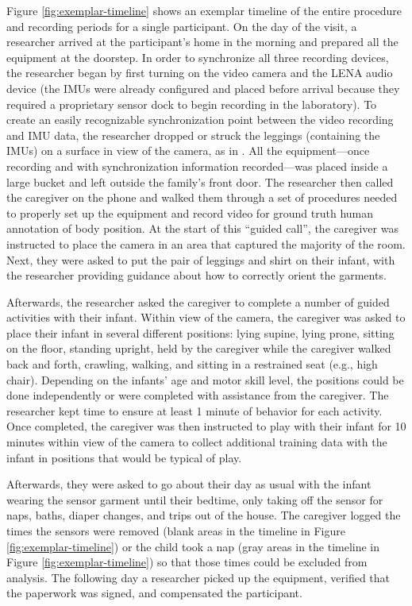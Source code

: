 \documentclass[
  man]{apa6}
\begin{document}
Figure \ref{fig:exemplar-timeline} shows an exemplar timeline of the entire procedure and recording periods for a single participant. On the day of the visit, a researcher arrived at the participant's home in the morning and prepared all the equipment at the doorstep. In order to synchronize all three recording devices, the researcher began by first turning on the video camera and the LENA audio device (the IMUs were already configured and placed before arrival because they required a proprietary sensor dock to begin recording in the laboratory). To create an easily recognizable synchronization point between the video recording and IMU data, the researcher dropped or struck the leggings (containing the IMUs) on a surface in view of the camera, as in \textcite{FranchakScott2021}. All the equipment---once recording and with synchronization information recorded---was placed inside a large bucket and left outside the family's front door. The researcher then called the caregiver on the phone and walked them through a set of procedures needed to properly set up the equipment and record video for ground truth human annotation of body position. At the start of this ``guided call'', the caregiver was instructed to place the camera in an area that captured the majority of the room. Next, they were asked to put the pair of leggings and shirt on their infant, with the researcher providing guidance about how to correctly orient the garments.

Afterwards, the researcher asked the caregiver to complete a number of guided activities with their infant. Within view of the camera, the caregiver was asked to place their infant in several different positions: lying supine, lying prone, sitting on the floor, standing upright, held by the caregiver while the caregiver walked back and forth, crawling, walking, and sitting in a restrained seat (e.g., high chair). Depending on the infants' age and motor skill level, the positions could be done independently or were completed with assistance from the caregiver. The researcher kept time to ensure at least 1 minute of behavior for each activity. Once completed, the caregiver was then instructed to play with their infant for 10 minutes within view of the camera to collect additional training data with the infant in positions that would be typical of play.

Afterwards, they were asked to go about their day as usual with the infant wearing the sensor garment until their bedtime, only taking off the sensor for naps, baths, diaper changes, and trips out of the house. The caregiver logged the times the sensors were removed (blank areas in the timeline in Figure \ref{fig:exemplar-timeline}) or the child took a nap (gray areas in the timeline in Figure \ref{fig:exemplar-timeline}) so that those times could be excluded from analysis. The following day a researcher picked up the equipment, verified that the paperwork was signed, and compensated the participant.
\end{document}
